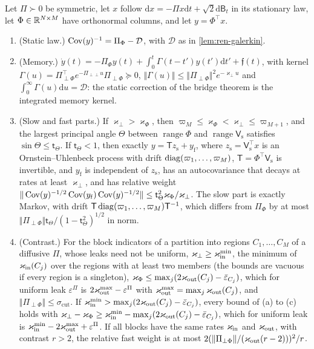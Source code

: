 \begin{theorem}\label{thm:ren-memory}
Let $\Pi\succ0$ be symmetric, let $x$ follow $\mathrm dx=-\Pi x\mathrm dt+\sqrt2\mathrm d\mathsf B_t$ in its stationary law, let $\Phi\in\mathbb{R}^{N\times M}$ have orthonormal columns, and let $y=\Phi^\top x$.
\begin{enumerate}
\item[(a)] (Static law.) $\operatorname{Cov}(y)^{-1}=\Pi_\Phi-\mathcal D$, with $\mathcal D$ as in \cref{lem:ren-galerkin}.
\item[(b)] (Memory.) $\dot y(t)=-\Pi_\Phi y(t)+\int_0^t\Gamma(t-t')y(t')\mathrm dt'+\mathfrak f(t)$, with kernel $\Gamma(u)=\Pi_{\perp\Phi}^\top e^{-\Pi_{\perp\perp}u}\Pi_{\perp\Phi}\succeq0$, $\Vert\Gamma(u)\Vert\le\Vert\Pi_{\perp\Phi}\Vert^2e^{-\varkappa_\perp u}$ and $\int_0^\infty\Gamma(u)\mathrm du=\mathcal D$: the static correction of the bridge theorem is the integrated memory kernel.
\item[(c)] (Slow and fast parts.) If $\varkappa_\perp>\varkappa_\Phi$, then $\varpi_M\le\varkappa_\Phi<\varkappa_\perp\le\varpi_{M+1}$, and the largest principal angle $\Theta$ between $\operatorname{range}\Phi$ and $\operatorname{range}\mathsf V_{\mathrm s}$ satisfies $\sin\Theta\le\mathsf t_\Theta$. If $\mathsf t_\Theta<1$, then exactly $y=\mathsf Tz_{\mathrm s}+y_{\mathrm f}$, where $z_{\mathrm s}=\mathsf V_{\mathrm s}^\top x$ is an Ornstein--Uhlenbeck process with drift $\operatorname{diag}(\varpi_1,\dots,\varpi_M)$, $\mathsf T=\Phi^\top\mathsf V_{\mathrm s}$ is invertible, and $y_{\mathrm f}$ is independent of $z_{\mathrm s}$, has an autocovariance that decays at rates at least $\varkappa_\perp$, and has relative weight $\Vert\operatorname{Cov}(y)^{-1/2}\operatorname{Cov}(y_{\mathrm f})\operatorname{Cov}(y)^{-1/2}\Vert\le\mathsf t_\Theta^2\varkappa_\Phi/\varkappa_\perp$. The slow part is exactly Markov, with drift $\mathsf T\operatorname{diag}(\varpi_1,\dots,\varpi_M)\mathsf T^{-1}$, which differs from $\Pi_\Phi$ by at most $\Vert\Pi_{\perp\Phi}\Vert\mathsf t_\Theta/(1-\mathsf t_\Theta^2)^{1/2}$ in norm.
\item[(d)] (Contrast.) For the block indicators of a partition into regions $C_1,\dots,C_M$ of a diffusive $\Pi$, whose leaks need not be uniform, $\varkappa_\perp\ge\varkappa_{\mathrm{in}}^{\min}$, the minimum of $\varkappa_{\mathrm{in}}(C_j)$ over the regions with at least two members (the bounds are vacuous if every region is a singleton), $\varkappa_\Phi\le\max_j(2\varkappa_{\mathrm{out}}(C_j)-\bar\varepsilon_{C_j})$, which for uniform leak $\varepsilon^\Pi$ is $2\varkappa_{\mathrm{out}}^{\max}-\varepsilon^\Pi$ with $\varkappa_{\mathrm{out}}^{\max}=\max_j\varkappa_{\mathrm{out}}(C_j)$, and $\Vert\Pi_{\perp\Phi}\Vert\le\sigma_{\mathrm{cut}}$. If $\varkappa_{\mathrm{in}}^{\min}>\max_j(2\varkappa_{\mathrm{out}}(C_j)-\bar\varepsilon_{C_j})$, every bound of (a) to (c) holds with $\varkappa_\perp-\varkappa_\Phi\ge\varkappa_{\mathrm{in}}^{\min}-\max_j(2\varkappa_{\mathrm{out}}(C_j)-\bar\varepsilon_{C_j})$, which for uniform leak is $\varkappa_{\mathrm{in}}^{\min}-2\varkappa_{\mathrm{out}}^{\max}+\varepsilon^\Pi$. If all blocks have the same rates $\varkappa_{\mathrm{in}}$ and $\varkappa_{\mathrm{out}}$, with contrast $r>2$, the relative fast weight is at most $2(\Vert\Pi_{\perp\Phi}\Vert/(\varkappa_{\mathrm{out}}(r-2)))^2/r$.
\end{enumerate}
\end{theorem}
